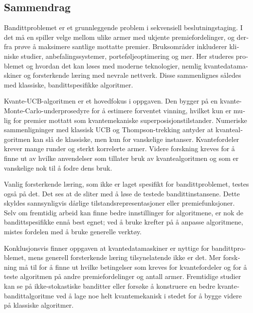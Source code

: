 \begin{otherlanguage}{norsk}

    \chapter{Sammendrag}
    Bandittproblemet er et grunnleggende problem i sekvensiell beslutningstaging.
    I det må en spiller velge mellom ulike armer med ukjente premiefordelinger, og derfra prøve å maksimere santlige mottatte premier.
    Bruksområder inkluderer kliniske studier, anbefalingssystemer, porteføljeoptimering og mer.
    Her studeres problemet og hvordan det kan løses med moderne teknologier, nemlig kvantedatamaskiner og forsterkende læring med nevrale nettverk.
    Disse sammenlignes således med klassiske, bandittspesifikke algoritmer.

    Kvante-UCB-algoritmen er et hovedfokus i oppgaven.
    Den bygger på en kvante-Monte-Carlo-underprosedyre for å estimere forventet vinning, hvilket kun er mulig for premier mottatt som kvantemekaniske superposisjonstilstander.
    Numeriske sammenligninger med klassisk UCB og Thompson-trekking antyder at kvantealgoritmen kan slå de klassiske, men kun for vanskelige instanser.
    Kvantefordeler krever mange runder og sterkt korrelerte armer.
    Videre forskning kreves for å finne ut av hvilke anvendelser som tillater bruk av kvantealgoritmen og som er vanskelige nok til å fodre dens bruk.

    Vanlig forsterkende læring, som ikke er laget spesifikt for bandittproblemet, testes også på det.
    Det ses at de sliter med å løse de testede bandittinstansene.
    Dette skyldes sannsynligvis dårlige tilstandsrepresentasjoner eller premiefunksjoner.
    Selv om fremtidig arbeid kan finne bedre innstillinger for algoritmene, er nok de bandittspesifikke ennå best egnet; ved å bruke krefter på å anpasse algoritmene, mistes fordelen med å bruke generelle verktøy.

    Konklusjonsvis finner oppgaven at kvantedatamaskiner er nyttige for bandittproblemet, mens generell forsterkende læring tilsynelatende ikke er det.
    Mer forskning må til for å finne ut hvilke betingelser som kreves for kvantefordeler og for å teste algoritmen på andre premiefordelinger og antall armer.
    Fremtidige studier kan se på ikke-stokastiske banditter eller forsøke å konstruere en bedre kvantebandittalgoritme ved å lage noe helt kvantemekanisk i stedet for å bygge videre på klassiske algoritmer.

\end{otherlanguage}

\cleardoublepage